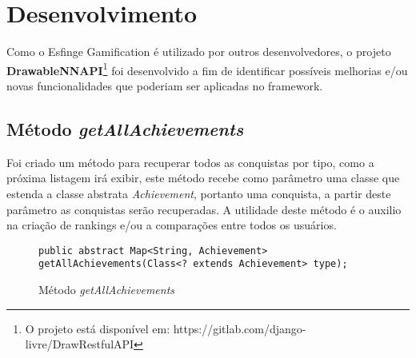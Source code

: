 \newpage
\chapter{Desenvolvimento}
\label{ch:desenvolvimento}


\par Como o Esfinge Gamification é utilizado por outros desenvolvedores, o projeto \textbf{DrawableNNAPI}\footnote{O projeto está disponível em: https://gitlab.com/django-livre/DrawRestfulAPI} foi desenvolvido a fim de identificar possíveis melhorias e/ou novas funcionalidades que poderiam ser aplicadas no framework.

\section{Método \textit{getAllAchievements}}
\par Foi criado um método para recuperar todos as conquistas por tipo, como a próxima listagem irá exibir, este método recebe como parâmetro uma classe que estenda a classe abstrata \textit{Achievement}, portanto uma conquista, a partir deste parâmetro as conquistas serão recuperadas. A utilidade deste método é o auxilio na criação de rankings e/ou a comparações entre todos os usuários.

\begin{figure}[H]
    \centering
    \begin{lstlisting}
public abstract Map<String, Achievement> getAllAchievements(Class<? extends Achievement> type);
\end{lstlisting}
    \caption{Método \textit{getAllAchievements}}
    \label{fig:metodo getAllAchievement}
\end{figure}
